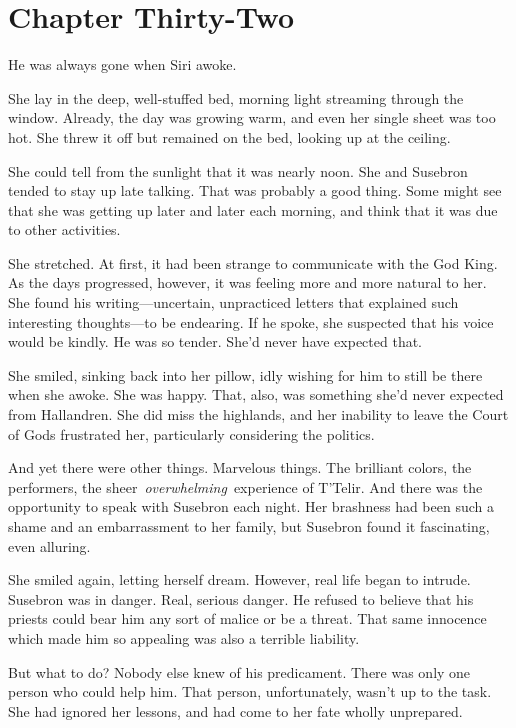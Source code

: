 \section{Chapter Thirty-Two}

He was always gone when Siri awoke.

She lay in the deep, well-stuffed bed, morning light streaming through the window. Already, the day was growing warm, and even her single sheet was too hot. She threw it off but remained on the bed, looking up at the ceiling.

She could tell from the sunlight that it was nearly noon. She and Susebron tended to stay up late talking. That was probably a good thing. Some might see that she was getting up later and later each morning, and think that it was due to other activities.

She stretched. At first, it had been strange to communicate with the God King. As the days progressed, however, it was feeling more and more natural to her. She found his writing—uncertain, unpracticed letters that explained such interesting thoughts—to be endearing. If he spoke, she suspected that his voice would be kindly. He was so tender. She’d never have expected that.

She smiled, sinking back into her pillow, idly wishing for him to still be there when she awoke. She was happy. That, also, was something she’d never expected from Hallandren. She did miss the highlands, and her inability to leave the Court of Gods frustrated her, particularly considering the politics.

And yet there were other things. Marvelous things. The brilliant colors, the performers, the sheer~\textit{overwhelming}~experience of T’Telir. And there was the opportunity to speak with Susebron each night. Her brashness had been such a shame and an embarrassment to her family, but Susebron found it fascinating, even alluring.

She smiled again, letting herself dream. However, real life began to intrude. Susebron was in danger. Real, serious danger. He refused to believe that his priests could bear him any sort of malice or be a threat. That same innocence which made him so appealing was also a terrible liability.

But what to do? Nobody else knew of his predicament. There was only one person who could help him. That person, unfortunately, wasn’t up to the task. She had ignored her lessons, and had come to her fate wholly unprepared.


